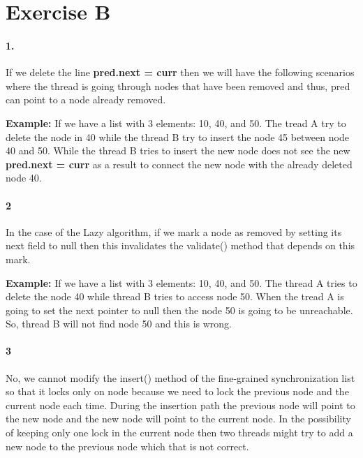 \section*{Exercise B}
\paragraph{1.}
If we delete the line \textbf{pred.next = curr} then we will have the
following scenarios where the thread is going through nodes that have
been removed and thus, pred can point to a node already removed. 

\textbf{Example:}
If we have a list with 3 elements: 10, 40, and 50. The tread A try to
delete the node in 40 while the thread B try to insert the node 45
between node 40 and 50. While the thread B tries to insert the new
node does not see the new \textbf{pred.next = curr} as a result to
connect the new node with the already deleted node 40.

\paragraph{2}
In the case of the Lazy algorithm, if we mark a node as removed by
setting its next field to null then this invalidates the validate()
method that depends on this mark.

\textbf{Example:}
If we have a list with 3 elements: 10, 40, and 50. The thread A tries
to delete the node 40 while thread B tries to access node 50. When the
tread A is going to set the next pointer to null then the node 50 is
going to be unreachable. So, thread B will not find node 50 and this
is wrong.

\paragraph{3}
No, we cannot modify the insert() method of the fine-grained
synchronization list so that it locks only on node because we need to
lock the previous node and the current node each time. During the
insertion path the previous node will point to the new node and the
new node will point to the current node. In the possibility of keeping
only one lock in the current node then two threads might try to add a
new node to the previous node which that is not correct. 
